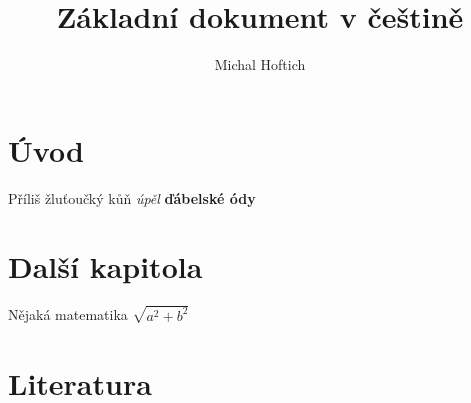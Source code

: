 \documentclass{article}
\title{Základní dokument v češtině}
\author{Michal Hoftich}
\begin{document}
\maketitle
\tableofcontents
\section{Úvod}
Příliš žluťoučký kůň \textit{úpěl} \textbf{ďábelské ódy} \parencite{article-full}

\section{Další kapitola}

Nějaká matematika $\sqrt{a^{2} + b^{2}}$
\section{Literatura}
\printbibliography
\end{document}
